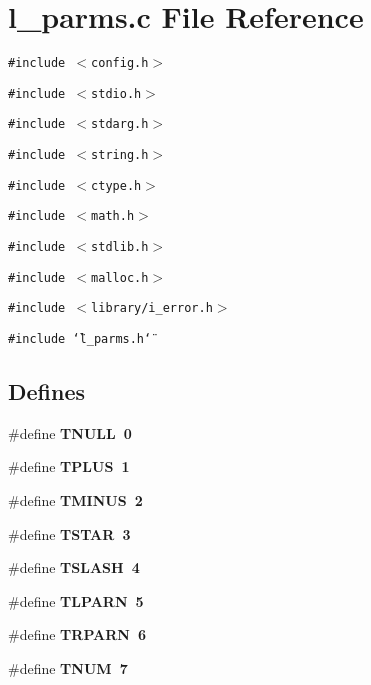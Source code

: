\section{l\_\-parms.c File Reference}
\label{l__parms_8c}
{\tt \#include $<$config.h$>$}\par
{\tt \#include $<$stdio.h$>$}\par
{\tt \#include $<$stdarg.h$>$}\par
{\tt \#include $<$string.h$>$}\par
{\tt \#include $<$ctype.h$>$}\par
{\tt \#include $<$math.h$>$}\par
{\tt \#include $<$stdlib.h$>$}\par
{\tt \#include $<$malloc.h$>$}\par
{\tt \#include $<$library/i\_\-error.h$>$}\par
{\tt \#include \char`\"{}l\_\-parms.h\char`\"{}}\par
\subsection*{Defines}
\begin{CompactItemize}
\item 
\#define \bf{TNULL}~0
\item 
\#define \bf{TPLUS}~1
\item 
\#define \bf{TMINUS}~2
\item 
\#define \bf{TSTAR}~3
\item 
\#define \bf{TSLASH}~4
\item 
\#define \bf{TLPARN}~5
\item 
\#define \bf{TRPARN}~6
\item 
\#define \bf{TNUM}~7
\end{CompactItemize}
